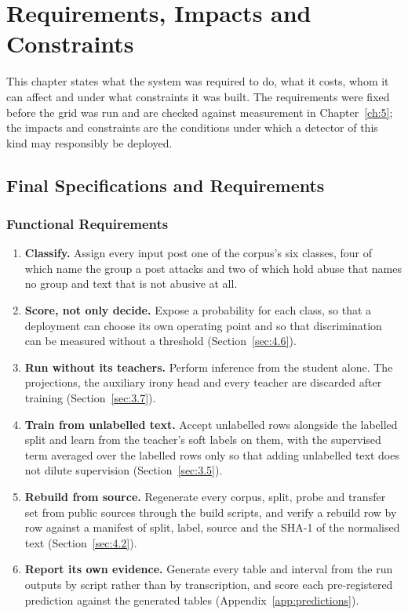
\chapter{Requirements, Impacts and Constraints}
\label{ch:3}
This chapter states what the system was required to do, what it costs, whom it can affect and under
what constraints it was built. The requirements were fixed before the grid was run and are checked
against measurement in Chapter~\ref{ch:5}; the impacts and constraints are the conditions under which
a detector of this kind may responsibly be deployed.

\section{Final Specifications and Requirements}
\label{sec:req}

\subsection{Functional Requirements}
\label{sec:req.func}
\begin{enumerate}[label=F\arabic*., leftmargin=3.1em]
  \item \textbf{Classify.} Assign every input post one of the corpus's six classes, four of which name
    the group a post attacks and two of which hold abuse that names no group and text that is not
    abusive at all.
  \item \textbf{Score, not only decide.} Expose a probability for each class, so that a deployment can
    choose its own operating point and so that discrimination can be measured without a threshold
    (Section~\ref{sec:4.6}).
  \item \textbf{Run without its teachers.} Perform inference from the student alone. The projections,
    the auxiliary irony head and every teacher are discarded after training
    (Section~\ref{sec:3.7}).
  \item \textbf{Train from unlabelled text.} Accept unlabelled rows alongside the labelled split and
    learn from the teacher's soft labels on them, with the supervised term averaged over the labelled
    rows only so that adding unlabelled text does not dilute supervision (Section~\ref{sec:3.5}).
  \item \textbf{Rebuild from source.} Regenerate every corpus, split, probe and transfer set from
    public sources through the build scripts, and verify a rebuild row by row against a manifest of
    split, label, source and the SHA-1 of the normalised text (Section~\ref{sec:4.2}).
  \item \textbf{Report its own evidence.} Generate every table and interval from the run outputs by
    script rather than by transcription, and score each pre-registered prediction against the
    generated tables (Appendix~\ref{app:predictions}).
\end{enumerate}

